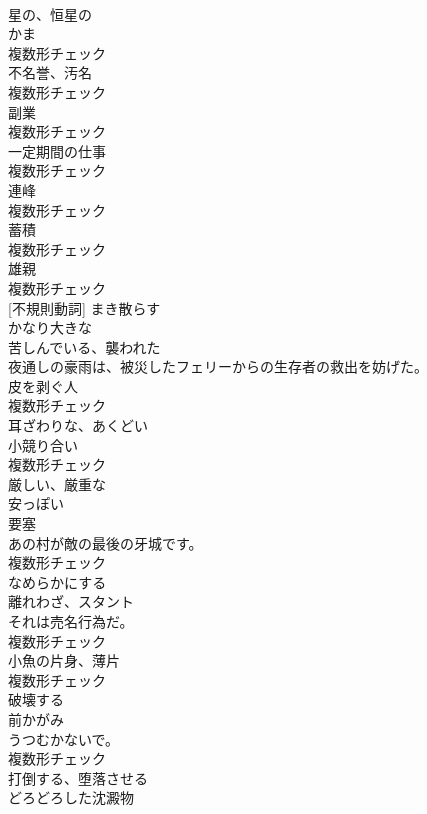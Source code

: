 \documentclass[8pt]{extreport}
\begin{document}
\begin{CJK}{UTF8}{min}
\\	[形容詞]	星の、恒星の	
\\	[名詞]	かま	
\\	複数形チェック
\\	[名詞]	不名誉、汚名	
\\	複数形チェック
\\	[名詞]	副業	
\\	複数形チェック
\\	[名詞]	一定期間の仕事	
\\	複数形チェック
\\	[名詞]	連峰	
\\	複数形チェック
\\	[名詞]	蓄積	
\\	複数形チェック
\\	[名詞]	雄親	
\\	複数形チェック
\\	[動詞] [不規則動詞]	まき散らす	
\\	[形容詞]	かなり大きな	
\\	[形容詞]	苦しんでいる、襲われた	
\\	夜通しの豪雨は、被災したフェリーからの生存者の救出を妨げた。	
\\	[名詞]	皮を剥ぐ人	
\\	複数形チェック
\\	[形容詞]	耳ざわりな、あくどい	
\\	[名詞]	小競り合い	
\\	複数形チェック
\\	[形容詞]	厳しい、厳重な	
\\	[形容詞]	安っぽい	
\\	[名詞]	要塞	
\\	あの村が敵の最後の牙城です。	
\\	複数形チェック
\\	[動詞]	なめらかにする	
\\	[名詞]	離れわざ、スタント	
\\	それは売名行為だ。	
\\	複数形チェック
\\	[名詞]	小魚の片身、薄片	
\\	複数形チェック
\\	[形容詞]	破壊する	
\\	[名詞]	前かがみ	
\\	うつむかないで。	
\\	複数形チェック
\\	[動詞]	打倒する、堕落させる	
\\	[名詞]	どろどろした沈澱物	

\end{CJK}
\end{document}
